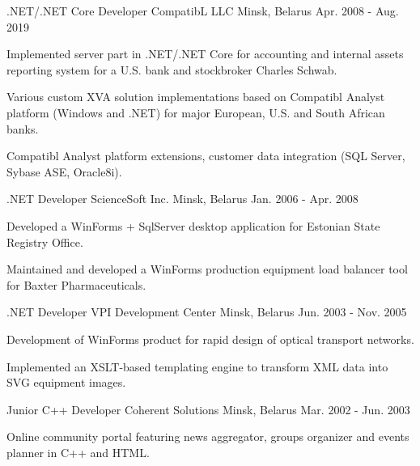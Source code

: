\begin{cventries}
  \cventry
    {.NET/.NET Core Developer} %
    {CompatibL LLC} %
    {Minsk, Belarus} %
    {Apr. 2008 - Aug. 2019} %
    {
      \begin{cvitems} %
        \item {Implemented server part in .NET/.NET Core for accounting and internal assets reporting system for a U.S. bank and stockbroker Charles Schwab.}
        \item {Various custom XVA solution implementations based on Compatibl Analyst platform (Windows and .NET) for major European, U.S. and South African banks.}
        \item {Compatibl Analyst platform extensions, customer data integration (SQL Server, Sybase ASE, Oracle8i).}  
      \end{cvitems}
    }

  \cventry
    {.NET Developer} %
    {ScienceSoft Inc.} %
    {Minsk, Belarus} %
    {Jan. 2006 - Apr. 2008} %
    {
      \begin{cvitems} %
        \item {Developed a WinForms + SqlServer desktop application for Estonian State Registry Office.}
        \item {Maintained and developed a WinForms production equipment load balancer tool for Baxter Pharmaceuticals.}
      \end{cvitems}
    }

  \cventry
    {.NET Developer} %
    {VPI Development Center} %
    {Minsk, Belarus} %
    {Jun. 2003 - Nov. 2005} %
    {
      \begin{cvitems} %
        \item {Development of WinForms product for rapid design of optical transport networks.}
        \item {Implemented an XSLT-based templating engine to transform XML data into SVG equipment images.}
      \end{cvitems}
    }

  \cventry
    {Junior C++ Developer} %
    {Coherent Solutions} %
    {Minsk, Belarus} %
    {Mar. 2002 - Jun. 2003} %
    {
      \begin{cvitems} %
        \item {Online community portal featuring news aggregator, groups organizer and events planner in C++ and HTML.}
      \end{cvitems}
    }

\end{cventries}
